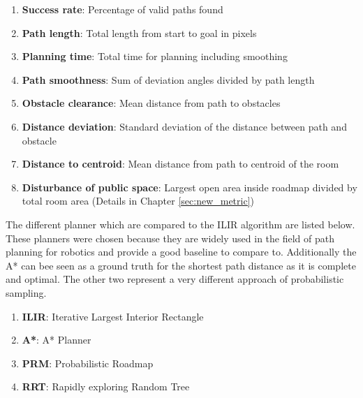 \begin{enumerate}
  \item \textbf{Success rate}: Percentage of valid paths found
  \item \textbf{Path length}: Total length from start to goal in pixels
  \item \textbf{Planning time}: Total time for planning including smoothing
  \item \textbf{Path smoothness}: Sum of deviation angles divided by path length
  \item \textbf{Obstacle clearance}: Mean distance from path to obstacles
  \item \textbf{Distance deviation}: Standard deviation of the distance between path and obstacle
  \item \textbf{Distance to centroid}: Mean distance from path to centroid of the room
  \item \textbf{Disturbance of public space}: Largest open area inside roadmap divided by total room area (Details in Chapter \ref{sec:new_metric})
\end{enumerate}

The different planner which are compared to the ILIR algorithm are listed below. These planners were chosen because they are widely used in the field of path planning for robotics and provide a good baseline to compare to. Additionally the A* can bee seen as a ground truth for the shortest path distance as it is complete and optimal. The other two represent a very different approach of probabilistic sampling.

\begin{enumerate}
    \item \textbf{ILIR}: Iterative Largest Interior Rectangle
    \item \textbf{A*}: A* Planner
    \item \textbf{PRM}: Probabilistic Roadmap
    \item \textbf{RRT}: Rapidly exploring Random Tree
\end{enumerate}

